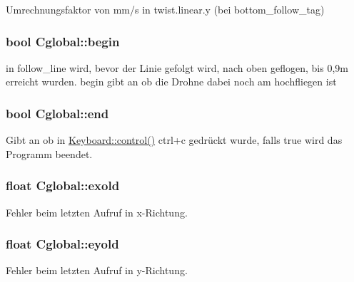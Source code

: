 Umrechnungsfaktor von mm/s in twist.linear.y (bei bottom\_\-follow\_\-tag) 

\hypertarget{class_cglobal_a2b9c1321be7adaacc3bed175e49fb02b}{
\subsubsection[{begin}]{\setlength{\rightskip}{0pt plus 5cm}bool {\bf Cglobal::begin}}}
\label{class_cglobal_a2b9c1321be7adaacc3bed175e49fb02b}


in follow\_\-line wird, bevor der Linie gefolgt wird, nach oben geflogen, bis 0,9m erreicht wurden. begin gibt an ob die Drohne dabei noch am hochfliegen ist 

\hypertarget{class_cglobal_a24fbb5c4b0ddab650375d08ba677b3f1}{
\subsubsection[{end}]{\setlength{\rightskip}{0pt plus 5cm}bool {\bf Cglobal::end}}}
\label{class_cglobal_a24fbb5c4b0ddab650375d08ba677b3f1}


Gibt an ob in \hyperlink{namespace_keyboard_abfb3168172d115a6516147c6d42f58db}{Keyboard::control()} ctrl+c gedrückt wurde, falls true wird das Programm beendet. 

\hypertarget{class_cglobal_ae7af3539af53f18897359057206803d3}{
\subsubsection[{exold}]{\setlength{\rightskip}{0pt plus 5cm}float {\bf Cglobal::exold}}}
\label{class_cglobal_ae7af3539af53f18897359057206803d3}


Fehler beim letzten Aufruf in x-\/Richtung. 

\hypertarget{class_cglobal_a5ea9466dbc474b2f9b469395ae8d688c}{
\subsubsection[{eyold}]{\setlength{\rightskip}{0pt plus 5cm}float {\bf Cglobal::eyold}}}
\label{class_cglobal_a5ea9466dbc474b2f9b469395ae8d688c}


Fehler beim letzten Aufruf in y-\/Richtung. 

